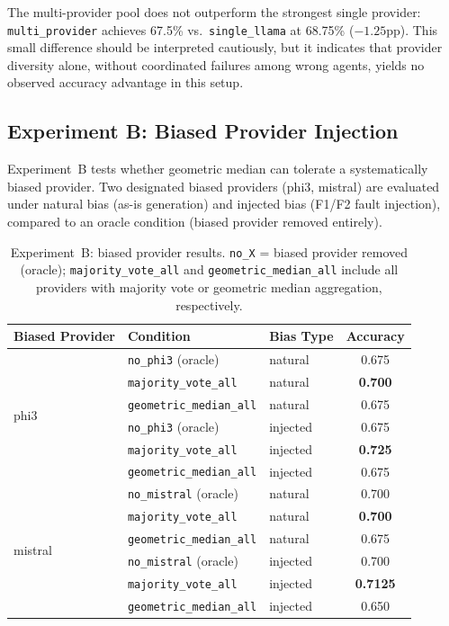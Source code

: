 \documentclass[11pt]{article}
\begin{document}
The multi-provider pool does not outperform the strongest single provider:
\texttt{multi\_provider} achieves 67.5\% vs.\ \texttt{single\_llama} at 68.75\%
($-1.25$pp). This small difference should be interpreted cautiously, but it
indicates that provider diversity alone, without coordinated failures among wrong
agents, yields no observed accuracy advantage in this setup.

\subsection{Experiment B: Biased Provider Injection}
\label{sec:exp-b}

Experiment~B tests whether geometric median can tolerate a systematically biased
provider. Two designated biased providers (phi3, mistral) are evaluated under
natural bias (as-is generation) and injected bias (F1/F2 fault injection),
compared to an oracle condition (biased provider removed entirely).

\begin{table}[t]
\centering
\caption{Experiment~B: biased provider results. \texttt{no\_X} = biased provider
  removed (oracle); \texttt{majority\_vote\_all} and \texttt{geometric\_median\_all}
  include all providers with majority vote or geometric median aggregation,
  respectively.}
\label{tab:exp-b}
\small
\begin{tabular}{lllc}
\toprule
\textbf{Biased Provider} & \textbf{Condition} & \textbf{Bias Type} & \textbf{Accuracy} \\
\midrule
\multirow{6}{*}{phi3}
  & \texttt{no\_phi3} (oracle)       & natural  & 0.675 \\
  & \texttt{majority\_vote\_all}     & natural  & \textbf{0.700} \\
  & \texttt{geometric\_median\_all}  & natural  & 0.675 \\
  & \texttt{no\_phi3} (oracle)       & injected & 0.675 \\
  & \texttt{majority\_vote\_all}     & injected & \textbf{0.725} \\
  & \texttt{geometric\_median\_all}  & injected & 0.675 \\
\midrule
\multirow{6}{*}{mistral}
  & \texttt{no\_mistral} (oracle)    & natural  & 0.700 \\
  & \texttt{majority\_vote\_all}     & natural  & \textbf{0.700} \\
  & \texttt{geometric\_median\_all}  & natural  & 0.675 \\
  & \texttt{no\_mistral} (oracle)    & injected & 0.700 \\
  & \texttt{majority\_vote\_all}     & injected & \textbf{0.7125} \\
  & \texttt{geometric\_median\_all}  & injected & 0.650 \\
\bottomrule
\end{tabular}
\end{table}
\end{document}
